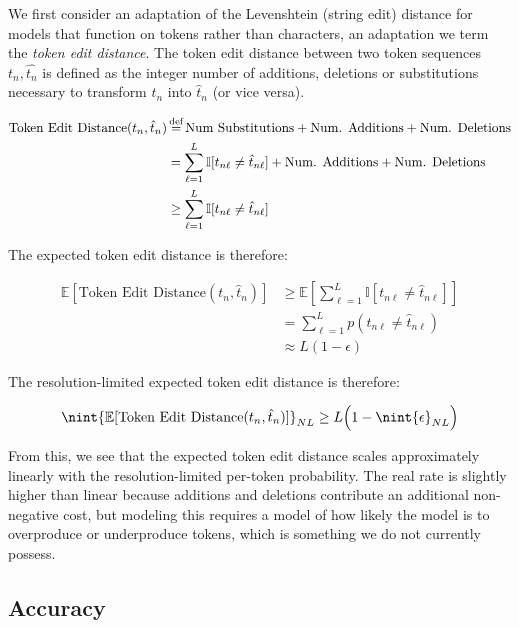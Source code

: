 We first consider an adaptation of the Levenshtein (string edit) distance for models that function on tokens rather than characters, an adaptation we term the \textit{token edit distance}. The token edit distance between two token sequences $t_n, \hat{t_n}$ is defined as the integer number of additions, deletions or substitutions necessary to transform $t_n$ into $\hat{t}_n$ (or vice versa).

\begin{align}
    \text{Token Edit Distance}(t_n, \hat{t}_n)  &\operatorname{\stackrel{\text{def}}{=}} \text{Num Substitutions} + \text{Num. Additions} + \text{Num. Deletions}\\
    &= \sum_{\ell =1}^L \mathbb{I}[t_{n\ell} \neq \hat{t}_{n\ell}] + \text{Num. Additions} + \text{Num. Deletions}\\
    &\geq \sum_{\ell =1}^L \mathbb{I}[t_{n\ell} \neq \hat{t}_{n\ell}]
\end{align}

The expected token edit distance is therefore:

\begin{align}
    \mathbb{E}[\text{Token Edit Distance}(t_n, \hat{t}_n)] &\geq \mathbb{E}[\sum_{\ell =1}^L \mathbb{I}[t_{n\ell} \neq \hat{t}_{n\ell}]]\\
    &= \sum_{\ell =1}^L p(t_{n\ell} \neq \hat{t}_{n\ell})\\
    &\approx L (1 - \epsilon)
\end{align}

The resolution-limited expected token edit distance is therefore:

\begin{equation}
    \nint{\mathbb{E}[\text{Token Edit Distance}(t_n, \hat{t}_n)]}_{NL} \geq L \Big(1 - \nint{\epsilon}_{NL} \Big)
\end{equation}

From this, we see that the expected token edit distance scales approximately linearly with the resolution-limited per-token probability. The real rate is slightly higher than linear because additions and deletions contribute an additional non-negative cost, but modeling this requires a model of how likely the model is to overproduce or underproduce tokens, which is something we do not currently possess.

\subsection{Accuracy}
\label{app:metric_scaling:accuracy}

